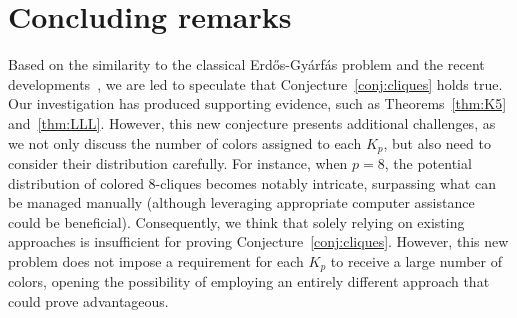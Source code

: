 \documentclass[11pt]{article}
\theoremstyle{definition}
\begin{document}
\section{Concluding remarks}\label{sec:Remarks}
Based on the similarity to the classical Erdős-Gyárfás problem and the recent developments~\cite{2015PLMSCFLS,2000Mubayi54,1998Mubayi43}, we are led to speculate that Conjecture~\ref{conj:cliques} holds true. Our investigation has produced supporting evidence, such as Theorems~\ref{thm:K5} and~\ref{thm:LLL}. However, this new conjecture presents additional challenges, as we not only discuss the number of colors assigned to each $K_{p}$, but also need to consider their distribution carefully. For instance, when $p=8$, the potential distribution of colored $8$-cliques becomes notably intricate, surpassing what can be managed manually (although leveraging appropriate computer assistance could be beneficial). Consequently, we think that solely relying on existing approaches is insufficient for proving Conjecture~\ref{conj:cliques}. However, this new problem does not impose a requirement for each $K_{p}$ to receive a large number of colors, opening the possibility of employing an entirely different approach that could prove advantageous.
 

 






























\end{document}

